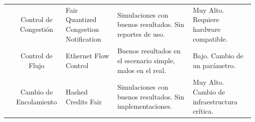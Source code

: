 \documentclass[runningheads,a4paper]{llncs}
\begin{document}
\begin{landscape}
\begin{table}[]
\begin{tabular}{|c|c|l|l|l|}
                                                  & Control de Congestión                                      & Fair Quantized Congestion Notification  & Simulaciones con buenos resultados. Sin reportes de uso.                & Muy Alto. Requiere hardware compatible.                           \\ \cline{2-5} 
                                                  & Control de Flujo                                           & Ethernet Flow Control                   & Buenos resultados en el escenario simple, malos en el real.             & Bajo. Cambio de un parámetro.                                     \\ \cline{2-5} 
                                                  & Cambio de Encolamiento                                     & Hashed Credits Fair                     & Simulaciones con buenos resultados. Sin implementaciones.               & Muy Alto. Cambio de infraestructura crítica.                      \\ \hline
\end{tabular}
\end{table}
\end{landscape}

\restoregeometry

\newpage

{}
\end{document}
